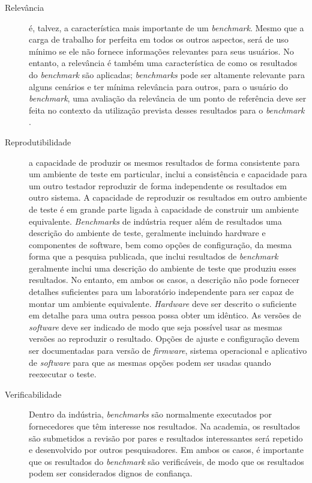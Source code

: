\begin{description}
	\item[Relevância] é, talvez, a característica mais importante de um \textit{benchmark}. Mesmo que a carga de trabalho for perfeita em todos os outros aspectos, será de uso mínimo se ele não fornece informações relevantes para seus usuários. No entanto, a relevância é também uma característica de como os resultados do \textit{benchmark} são aplicadas; \textit{benchmarks} pode ser altamente relevante para alguns cenários e ter mínima relevância para outros, para o usuário do \textit{benchmark}, uma avaliação da relevância de um ponto de referência deve ser feita no contexto da utilização prevista desses resultados para o \textit{benchmark} \cite{Kistowski2015}. 
	
	\item[Reprodutibilidade] a capacidade de produzir os mesmos resultados de forma consistente para um ambiente de teste em particular, inclui a consistência e capacidade para um outro testador reproduzir de forma independente os resultados em outro sistema. A capacidade de reproduzir os resultados em outro ambiente de teste é em grande parte ligada à capacidade de construir um ambiente equivalente. \textit{Benchmarks} de indústria requer além de resultados uma descrição do ambiente de teste, geralmente incluindo hardware e componentes de software, bem como opções de configuração, da mesma forma que a pesquisa publicada, que inclui resultados de \textit{benchmark} geralmente inclui uma descrição do ambiente de teste que produziu esses resultados. No entanto, em ambos os casos, a descrição não pode fornecer detalhes suficientes para um laboratório independente para ser capaz de montar um ambiente equivalente. \textit{Hardware} deve ser descrito o suficiente em detalhe para uma outra pessoa possa obter um idêntico. As versões de \textit{software} deve ser indicado de modo que seja possível usar as mesmas versões ao reproduzir o resultado. Opções de ajuste e configuração devem ser documentadas para versão de \textit{firmware}, sistema operacional e aplicativo de \textit{software} para que as mesmas opções podem ser usadas quando reexecutar o teste. \cite{Kistowski2015}
	
	\item[Verificabilidade] Dentro da indústria, \textit{benchmarks} são normalmente executados por fornecedores que têm interesse nos resultados. Na academia, os resultados são submetidos a revisão por pares e resultados interessantes será repetido e desenvolvido por outros pesquisadores. Em ambos os casos, é importante que os resultados do \textit{benchmark} são verificáveis, de modo que os resultados podem ser considerados dignos de confiança. \cite{Kistowski2015}
	

\end{description}
